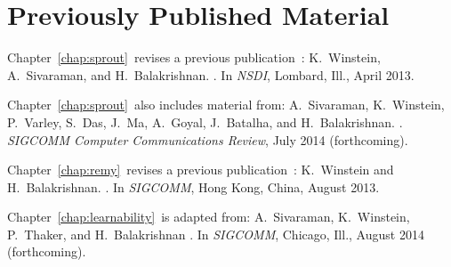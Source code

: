 \chapter*{Previously Published Material}
%

{
\setlength{\parindent}{0 pt}
\setlength{\parskip}{\baselineskip}

Chapter~\ref{chap:sprout}~revises a previous
publication~\cite{sprout}:
K.~Winstein, A.~Sivaraman, and H.~Balakrishnan.
.
\newblock In {\em NSDI}, Lombard, Ill., April 2013.

Chapter~\ref{chap:sprout}~also includes material from: A.~Sivaraman,
K.~Winstein, P.~Varley, S.~Das, J.~Ma, A.~Goyal, J.~Batalha, and
H.~Balakrishnan.  .  \newblock
{\em SIGCOMM Computer Communications Review}, July 2014 (forthcoming).

Chapter~\ref{chap:remy}~revises a previous publication~\cite{remy}:
K.~Winstein and H.~Balakrishnan.
.
\newblock In {\em SIGCOMM}, Hong Kong, China, August 2013.

Chapter~\ref{chap:learnability}~is adapted from:
A.~Sivaraman, K.~Winstein, P.~Thaker, and H.~Balakrishnan
. \newblock In {\em
  SIGCOMM}, Chicago, Ill., August 2014 (forthcoming).

}
